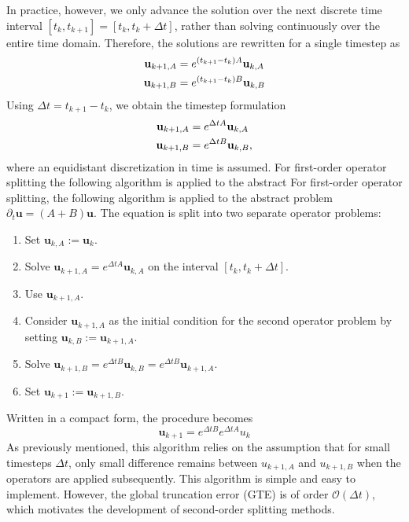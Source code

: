 In practice, however, we only advance the solution over the next discrete
time interval $[t_k, t_{k+1}]=[t_k, t_k + \Delta t]$, rather than solving
continuously over the entire time domain. Therefore, the solutions are
rewritten for a single timestep as
\begin{align}
    \textbf u_{k+1, A} &= e^{(t_{k+1} - t_k) A}\textbf u_{k, A} \\
    \textbf u_{k+1, B} &= e^{(t_{k+1} - t_k) B}\textbf u_{k, B} 
\end{align}
Using $\Delta t = t_{k+1}-t_k$, we obtain the timestep formulation
\begin{align}
    \textbf u_{k+1, A} &= e^{\Delta t A}\textbf u_{k, A} \\
    \textbf u_{k+1, B} &= e^{\Delta t B}\textbf u_{k, B},
\end{align}
where an equidistant discretization in time is assumed. 
For first-order operator splitting the following algorithm is applied to the abstract For first-order operator splitting, the following algorithm is applied to
the abstract problem $\partial_t \bm{u}= (A+B)\bm{u}$. The equation is
split into two separate operator problems:
\begin{enumerate}
    \item{Set $\bm{u}_{k,A}:= \bm{u}_k$.}
    \item{Solve $\bm{u}_{k+1, A} = e^{\Delta t A}\bm u_{k, A}$ on the
            interval $[t_{k}, t_k+\Delta t].$}
    \item{Use $\bm{u}_{k+1, A}$.}    
    \item{Consider $\bm{u}_{k+1, A}$ as the initial condition for the 
            second operator problem by setting
            $\bm{u}_{k,B}:=\bm{u}_{k+1,A}.$}
    \item{Solve $\bm{u}_{k+1, B} = e^{\Delta t B}\bm{u}_{k, B}
            =e^{\Delta t B}\bm{u}_{k+1, A}$.}
    \item {Set $\bm{u}_{k+1} := \bm{u}_{k+1,B}$.}
\end{enumerate}
Written in a compact form, the procedure becomes
$$\bm u_{k+1}= e^{\Delta t B}e^{\Delta t A}u_k$$
As previously mentioned, this algorithm relies on the assumption that for
small timesteps $\Delta t$, only small difference remains between 
$u_{k+1,A}$ and $u_{k+1,B}$ when the operators are applied subsequently.
This algorithm is simple and easy to implement. 
However, the global truncation error (GTE) is of order
$\mathcal{O}(\Delta t)$, which motivates the
development of second-order splitting methods.

